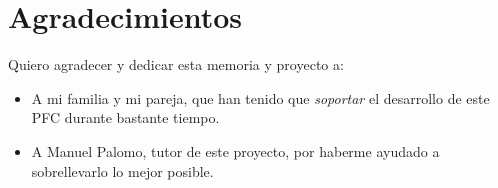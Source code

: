 \section*{Agradecimientos}
Quiero agradecer y dedicar esta memoria y proyecto a:

\begin{itemize}
\item A mi familia y mi pareja, que han tenido que
  \textit{soportar} el desarrollo de este PFC durante bastante tiempo.

\item A Manuel Palomo, tutor de este proyecto, por haberme ayudado a
  sobrellevarlo lo mejor posible.
 
\end{itemize}


